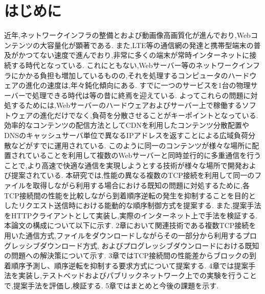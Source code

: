 \documentclass[a4j,12pt]{gradthesis_utf8}
\begin{document}
 
\maketitle %

\chapter{はじめに}\label{sec:sec1}
近年,ネットワークインフラの整備とおよび動画像高画質化が進んでおり,Webコンテンツの大容量化が顕著である.
また,LTE等の通信網の発達と携帯型端末の普及がかつてない速度で進んでおり,非常に多くの端末が常時インターネットに接続する時代となっている.
これにともない,Webサーバー等のネットワークインフラにかかる負担も増加しているものの,それを処理するコンピュータのハードウェアの進化の速度は,年々鈍化傾向にある.
すでに一つのサービスを1台の物理サーバーで処理できる時代は等の昔に終焉を迎えている.
よってこれらの問題に対処するためには,Webサーバーのハードウェアおよびサーバー上で稼働するソフトウェアの進化だけでなく,負荷を分散させることがキーポイントとなっている.
効率的なコンテンツの配信方法としてCDNを利用したコンテンツ分散配置やDNSのキャッシュサーバ単位で異なるIPアドレスを返すことによる広域負荷分散などがすでに運用されている.
このように同一のコンテンツが様々な場所に配置されていることを利用して複数のWebサーバーと同時並行的に多重通信を行うことで,より高速で快適な通信を実現しようとする技術が様々な場所で開発および提案されている.
本研究では,性能の異なる複数のTCP接続を利用して同一のファイルを取得しながら利用する場合における既知の問題に対処するために,各TCP接続間の性能を比較しながら到着順序逆転の発生を抑制することを目的としたリクエスト送信時における能動的な順序制御方式を提案する.
また,提案手法をHTTPクライアントとして実装し,実際のインターネット上で手法を検証する.
本論文の構成について以下に示す.
2章において関連技術である複数TCP接続を用いた通信方式,ファイルをダウンロードしながらその一部分から利用するプログレッシブダウンロード方式, およびプログレッシブダウンロードにおける既知の問題への解決策について示す.
3章ではTCP接続間の性能差からブロックの到着順序予測し、順序逆転を抑制する要求方式について提案する.
4章では提案手法を実装し,テストベッドおよびパブリックネットワーク上での実験を行うことで,提案手法を評価し,検証する.
5章ではまとめと今後の課題を示す.


\end{document}
